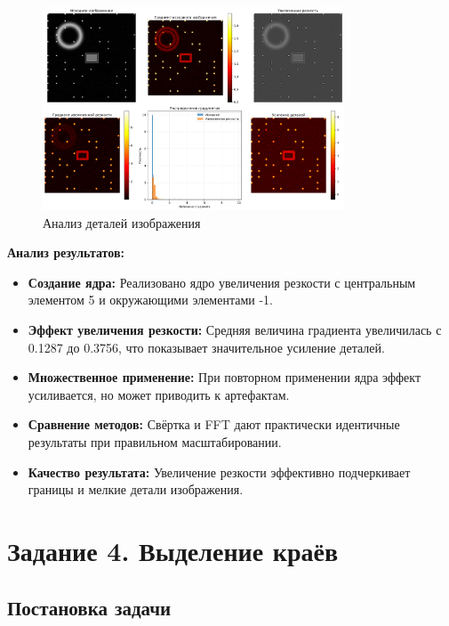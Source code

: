 \begin{figure}[H]
    \centering
    \includegraphics[width=0.8\textwidth]{images/task3/detail_analysis.png}
    \caption{Анализ деталей изображения}
    \label{fig:detail_analysis_sharp}
\end{figure}

\textbf{Анализ результатов:}
\begin{itemize}
    \item \textbf{Создание ядра:} Реализовано ядро увеличения резкости с центральным элементом 5 и окружающими элементами -1.
    
    \item \textbf{Эффект увеличения резкости:} Средняя величина градиента увеличилась с 0.1287 до 0.3756, что показывает значительное усиление деталей.
    
    \item \textbf{Множественное применение:} При повторном применении ядра эффект усиливается, но может приводить к артефактам.
    
    \item \textbf{Сравнение методов:} Свёртка и FFT дают практически идентичные результаты при правильном масштабировании.
    
    \item \textbf{Качество результата:} Увеличение резкости эффективно подчеркивает границы и мелкие детали изображения.
\end{itemize}

\section*{Задание 4. Выделение краёв}

\subsection*{Постановка задачи}

